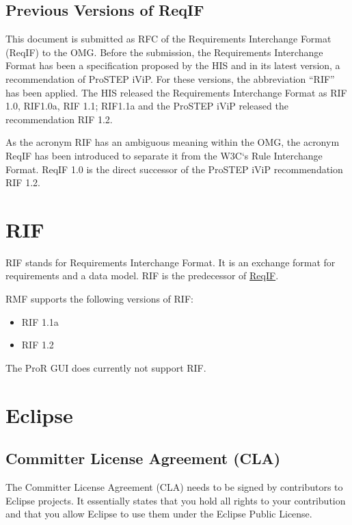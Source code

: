 \subsection{Previous Versions of ReqIF}

This document is submitted as RFC of the Requirements Interchange Format (ReqIF) to the OMG.  Before the submission, the Requirements Interchange Format has been a specification proposed by the HIS and in its latest version, a recommendation of ProSTEP iViP.  For these versions, the abbreviation ``RIF'' has been applied.  The HIS released the Requirements Interchange Format as RIF 1.0, RIF1.0a, RIF 1.1; RIF1.1a and the ProSTEP iViP released the recommendation RIF 1.2.

As the acronym RIF has an ambiguous meaning within the OMG, the acronym ReqIF has been introduced to separate it from the W3C`s Rule Interchange Format.  ReqIF 1.0 is the direct successor of the ProSTEP iViP recommendation RIF 1.2.

\section{RIF}

RIF stands for Requirements Interchange Format.  It is an exchange format for requirements and a data model.  RIF is the predecessor of \href{RMF/ReqIF}{ReqIF}.

RMF supports the following versions of RIF:

\begin{itemize}
\item RIF 1.1a
\item RIF 1.2
\end{itemize}

The ProR GUI does currently not support RIF.

\section{Eclipse}

\subsection{Committer License Agreement (CLA)}

The Committer License Agreement (CLA) needs to be signed by contributors to Eclipse projects.  It essentially states that you hold all rights to your contribution and that you allow Eclipse to use them under the Eclipse Public License.


